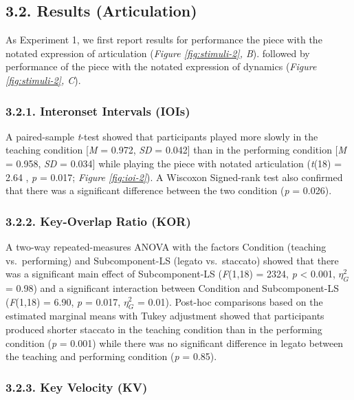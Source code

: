 \documentclass[
  english,
  man,floatsintext]{apa6}
\begin{document}
\hypertarget{results-articulation-1}{%
\subsection{3.2. Results (Articulation)}\label{results-articulation-1}}

As Experiment 1, we first report results for performance the piece with the notated expression of articulation (\emph{Figure \ref{fig:stimuli-2}, B}). followed by performance of the piece with the notated expression of dynamics (\emph{Figure \ref{fig:stimuli-2}, C}).

\hypertarget{interonset-intervals-iois-2}{%
\subsubsection{3.2.1. Interonset Intervals (IOIs)}\label{interonset-intervals-iois-2}}

A paired-sample \emph{t}-test showed that participants played more slowly in the teaching condition {[}\emph{M} = 0.972, \emph{SD} = 0.042{]} than in the performing condition {[}\emph{M} = 0.958, \emph{SD} = 0.034{]} while playing the piece with notated articulation (\emph{t}(18) = 2.64
, \emph{p} = 0.017; \emph{Figure \ref{fig:ioi-2}}). A Wiscoxon Signed-rank test also confirmed that there was a significant difference between the two condition (\emph{p} = 0.026).

\hypertarget{key-overlap-ratio-kor}{%
\subsubsection{3.2.2. Key-Overlap Ratio (KOR)}\label{key-overlap-ratio-kor}}

A two-way repeated-measures ANOVA with the factors Condition (teaching vs.~performing) and Subcomponent-LS (legato vs.~staccato) showed that there was a significant main effect of Subcomponent-LS (\emph{F}(1,18) = 2324, \emph{p} \textless{} 0.001, \(\eta_G^2\) = 0.98) and a significant interaction between Condition and Subcomponent-LS (\emph{F}(1,18) = 6.90, \emph{p} = 0.017, \(\eta_G^2\) = 0.01). Post-hoc comparisons based on the estimated marginal means with Tukey adjustment showed that participants produced shorter staccato in the teaching condition than in the performing condition (\emph{p} = 0.001) while there was no significant difference in legato between the teaching and performing condition (\emph{p} = 0.85).

\hypertarget{key-velocity-kv-2}{%
\subsubsection{3.2.3. Key Velocity (KV)}\label{key-velocity-kv-2}}
\end{document}
